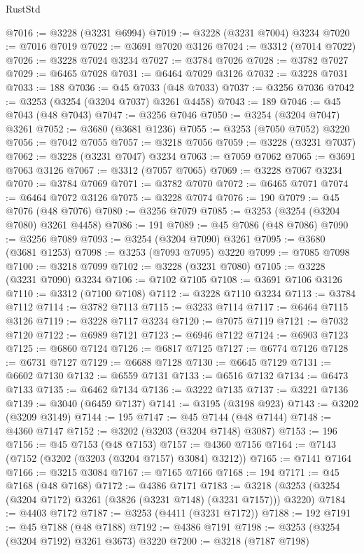 \begin{lexlean}{RustStd}
\begin{coremodule}
{\begin{coremodule}
{{{{{{{{{{{{{{{{{{{{{{{{{{{{{{{{{{{{{@7016 := @3228 (@3231 @6994)
@7019 := @3228 (@3231 @7004) @3234
@7020 := @7016 @7019
@7022 := @3691 @7020 @3126
@7024 := @3312 (@7014 @7022)
@7026 := @3228 @7024 @3234
@7027 := @3784 @7026
@7028 := @3782 @7027
@7029 := @6465 @7028
@7031 := @6464 @7029 @3126
@7032 := @3228 @7031
@7033 := 188
@7036 := @45 @7033 (@48 @7033)
@7037 := @3256 @7036
@7042 := @3253 (@3254 (@3204 @7037) @3261 @4458)
@7043 := 189
@7046 := @45 @7043 (@48 @7043)
@7047 := @3256 @7046
@7050 := @3254 (@3204 @7047) @3261
@7052 := @3680 (@3681 @1236)
@7055 := @3253 (@7050 @7052) @3220
@7056 := @7042 @7055
@7057 := @3218 @7056
@7059 := @3228 (@3231 @7037)
@7062 := @3228 (@3231 @7047) @3234
@7063 := @7059 @7062
@7065 := @3691 @7063 @3126
@7067 := @3312 (@7057 @7065)
@7069 := @3228 @7067 @3234
@7070 := @3784 @7069
@7071 := @3782 @7070
@7072 := @6465 @7071
@7074 := @6464 @7072 @3126
@7075 := @3228 @7074
@7076 := 190
@7079 := @45 @7076 (@48 @7076)
@7080 := @3256 @7079
@7085 := @3253 (@3254 (@3204 @7080) @3261 @4458)
@7086 := 191
@7089 := @45 @7086 (@48 @7086)
@7090 := @3256 @7089
@7093 := @3254 (@3204 @7090) @3261
@7095 := @3680 (@3681 @1253)
@7098 := @3253 (@7093 @7095) @3220
@7099 := @7085 @7098
@7100 := @3218 @7099
@7102 := @3228 (@3231 @7080)
@7105 := @3228 (@3231 @7090) @3234
@7106 := @7102 @7105
@7108 := @3691 @7106 @3126
@7110 := @3312 (@7100 @7108)
@7112 := @3228 @7110 @3234
@7113 := @3784 @7112
@7114 := @3782 @7113
@7115 := @3233 @7114
@7117 := @6464 @7115 @3126
@7119 := @3228 @7117 @3234
@7120 := @7075 @7119
@7121 := @7032 @7120
@7122 := @6989 @7121
@7123 := @6946 @7122
@7124 := @6903 @7123
@7125 := @6860 @7124
@7126 := @6817 @7125
@7127 := @6774 @7126
@7128 := @6731 @7127
@7129 := @6688 @7128
@7130 := @6645 @7129
@7131 := @6602 @7130
@7132 := @6559 @7131
@7133 := @6516 @7132
@7134 := @6473 @7133
@7135 := @6462 @7134
@7136 := @3222 @7135
@7137 := @3221 @7136
@7139 := @3040 (@6459 @7137)
@7141 := @3195 (@3198 @923)
@7143 := @3202 (@3209 @3149)
@7144 := 195
@7147 := @45 @7144 (@48 @7144)
@7148 := @4360 @7147
@7152 := @3202 (@3203 (@3204 @7148) @3087)
@7153 := 196
@7156 := @45 @7153 (@48 @7153)
@7157 := @4360 @7156
@7164 := @7143 (@7152 (@3202 (@3203 (@3204 @7157) @3084) @3212))
@7165 := @7141 @7164
@7166 := @3215 @3084
@7167 := @7165 @7166
@7168 := 194
@7171 := @45 @7168 (@48 @7168)
@7172 := @4386 @7171
@7183 := @3218 (@3253 (@3254 (@3204 @7172) @3261 (@3826 (@3231 @7148) (@3231 @7157))) @3220)
@7184 := @4403 @7172
@7187 := @3253 (@4411 (@3231 @7172))
@7188 := 192
@7191 := @45 @7188 (@48 @7188)
@7192 := @4386 @7191
@7198 := @3253 (@3254 (@3204 @7192) @3261 @3673) @3220
@7200 := @3218 (@7187 @7198)
}}}}}}}}}}}}}}}}}}}}}}}}}}}}}}}}}}}}}
\end{coremodule}}
\end{coremodule}
\end{lexlean}
